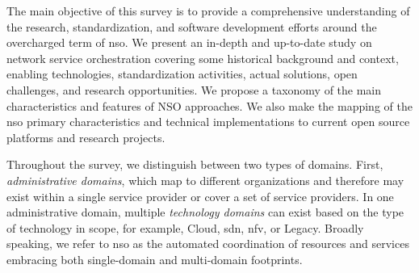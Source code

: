 

The main objective of this survey is to provide a comprehensive understanding of the research, standardization, and software development efforts around the overcharged term of  \acrlong{nso}. We present an in-depth and up-to-date study on network service orchestration covering some historical background and context, enabling technologies, standardization activities, actual solutions, open challenges, and research opportunities. We propose a taxonomy of the main characteristics and features of NSO approaches. We also make the mapping of the \gls{nso} primary characteristics and technical implementations to current open source platforms and research projects.    

Throughout the survey, we distinguish between two types of domains. First, \textit{administrative domains}, which map to different organizations and therefore may exist within a single service provider or cover a set of service providers. In one administrative domain, multiple \textit{technology domains} can exist based on the type of technology in scope, for example, Cloud, \gls{sdn}, \gls{nfv}, or Legacy. 
Broadly speaking, we refer to \gls{nso} as the automated coordination of resources and services embracing both single-domain and multi-domain footprints.  

